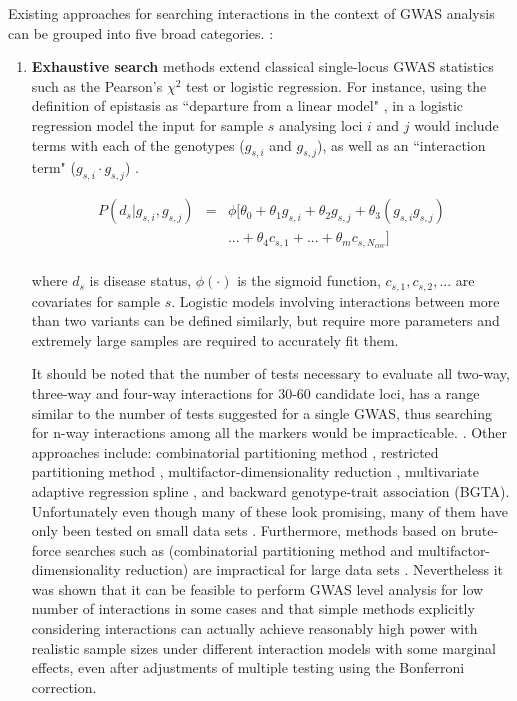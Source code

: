 Existing approaches for searching interactions in the context of GWAS analysis can be grouped into five broad categories. \cite{li2011detecting}:
\begin{enumerate}
	\item \textbf{Exhaustive search} methods extend classical single-locus GWAS statistics such as the Pearson's $\chi^2$ test or logistic regression.
For instance, using the definition of epistasis as ``departure from a linear model" \cite{cordell2009detecting}, in a logistic regression model the input for sample $s$ analysing loci $i$ and $j$ would include terms with each of the genotypes ($g_{s,i}$ and $g_{s,j}$), as well as an ``interaction term" ($g_{s,i} \cdot g_{s,j}$) \cite{cordell2002epistasis}. 

\begin{eqnarray*} \label{eq:gwasLogRegH1}
    P( d_s | g_{s,i},g_{s,j}) & = & \phi[ \theta_0 + \theta_1 g_{s,i} + \theta_2 g_{s,j} + \theta_3 (g_{s,i} g_{s,j}) \\
    & & ... + \theta_4 c_{s,1} + ... + \theta_m c_{s,N_{cov}} ] \\
\end{eqnarray*}

where $d_s$ is disease status, $\phi(\cdot)$ is the sigmoid function, $c_{s,1}, c_{s,2}, ... $ are covariates for sample $s$.
Logistic models involving interactions between more than two variants can be defined similarly, but require more parameters and extremely large samples are required to accurately fit them.

It should be noted that the number of tests necessary to evaluate all two-way, three-way and four-way interactions for 30-60 candidate loci, has a range similar to the number of tests suggested for a single GWAS, thus searching for n-way interactions among all the markers would be impracticable. \cite{culverhouse2002perspective}.
Other approaches include: combinatorial partitioning method \cite{REF}, restricted partitioning method \cite{REF}, multifactor-dimensionality reduction \cite{REF}, multivariate adaptive regression spline \cite{REF}, and backward genotype-trait association (BGTA)\cite{REF}. 
Unfortunately even though many of these look promising, many of them have only been tested on small data sets \cite{zhang2007bayesian}.
Furthermore, methods based on brute-force searches such as (combinatorial partitioning method and multifactor-dimensionality reduction) are impractical for large data sets \cite{zhang2007bayesian}.
Nevertheless it was shown \cite{li2011detecting} that it can be feasible to perform GWAS level analysis for low number of interactions in some cases and that simple methods explicitly considering interactions can actually achieve reasonably high power with realistic sample sizes under different interaction models with some marginal effects, even after adjustments of multiple testing using the Bonferroni correction.
	

\end{enumerate}

